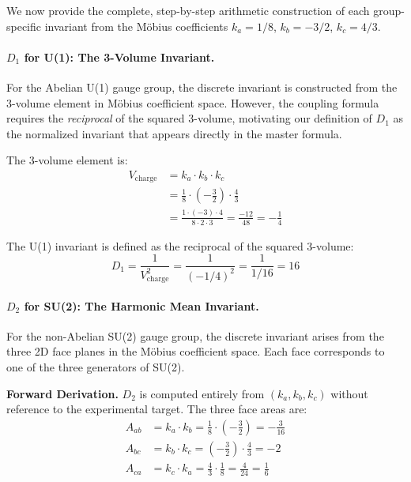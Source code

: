 \documentclass[11pt,twocolumn]{article}
\begin{document}
We now provide the complete, step-by-step arithmetic construction of each group-specific invariant from the Möbius coefficients $k_a = 1/8$, $k_b = -3/2$, $k_c = 4/3$.

\paragraph{$D_1$ for U(1): The 3-Volume Invariant.}
For the Abelian U(1) gauge group, the discrete invariant is constructed from the 3-volume element in Möbius coefficient space. However, the coupling formula requires the \emph{reciprocal} of the squared 3-volume, motivating our definition of $D_1$ as the normalized invariant that appears directly in the master formula.

The 3-volume element is:
\begin{align}
    V_{\text{charge}} &= k_a \cdot k_b \cdot k_c \\
    &= \frac{1}{8} \cdot \left(-\frac{3}{2}\right) \cdot \frac{4}{3} \\
    &= \frac{1 \cdot (-3) \cdot 4}{8 \cdot 2 \cdot 3} = \frac{-12}{48} = -\frac{1}{4}
\end{align}

The U(1) invariant is defined as the reciprocal of the squared 3-volume:
\begin{equation}
    D_1 = \frac{1}{V_{\text{charge}}^2} = \frac{1}{(-1/4)^2} = \frac{1}{1/16} = 16
\end{equation}

\paragraph{$D_2$ for SU(2): The Harmonic Mean Invariant.}
For the non-Abelian SU(2) gauge group, the discrete invariant arises from the three 2D face planes in the Möbius coefficient space. Each face corresponds to one of the three generators of SU(2).

\textbf{Forward Derivation.} $D_2$ is computed entirely from $(k_a, k_b, k_c)$ without reference to the experimental target. The three face areas are:
\begin{align}
    A_{ab} &= k_a \cdot k_b = \frac{1}{8} \cdot \left(-\frac{3}{2}\right) = -\frac{3}{16} \\
    A_{bc} &= k_b \cdot k_c = \left(-\frac{3}{2}\right) \cdot \frac{4}{3} = -2 \\
    A_{ca} &= k_c \cdot k_a = \frac{4}{3} \cdot \frac{1}{8} = \frac{4}{24} = \frac{1}{6}
\end{align}
\end{document}

